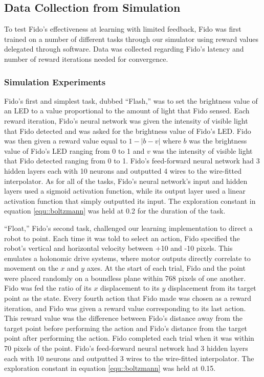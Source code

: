 \subsection{Data Collection from Simulation}

To test Fido's effectiveness at learning with limited feedback, Fido was first trained on a number of different tasks through our simulator using reward values delegated through software.
Data was collected regarding Fido's latency and number of reward iterations needed for convergence.

\subsubsection{Simulation Experiments}

Fido's first and simplest task, dubbed ``Flash,'' was to set the brightness value of an LED to a value proportional to the amount of light that Fido sensed.
Each reward iteration, Fido's neural network was given the intensity of visible light that Fido detected and was asked for the brightness value of Fido's LED.
Fido was then given a reward value equal to $1 - |b - v|$ where $b$ was the brightness value of Fido's LED ranging from 0 to 1 and $v$ was the intensity of visible light that Fido detected ranging from 0 to 1.
Fido's feed-forward neural network had 3 hidden layers each with 10 neurons and outputted 4 wires to the wire-fitted interpolator.
As for all of the tasks, Fido's neural network's input and hidden layers used a sigmoid activation function, while  its output layer used a linear activation function that simply outputted its input.
The exploration constant in equation \ref{equ::boltzmann} was held at 0.2 for the duration of the task.

``Float,'' Fido's second task, challenged our learning implementation to direct a robot to point.
Each time it was told to select an action, Fido specified the robot's vertical and horizontal velocity between +10 and -10 pixels.
This emulates a holonomic drive systems, where motor outputs directly correlate to movement on the $x$ and $y$ axes.
At the start of each trial, Fido and the point were placed randomly on a boundless plane within 768 pixels of one another.
Fido was fed the ratio of its $x$ displacement to its $y$ displacement from its target point as the state.
Every fourth action that Fido made was chosen as a reward iteration, and Fido was given a reward value corresponding to its last action.
This reward value was the difference between Fido's distance away from the target point before performing the action and Fido's distance from the target point after performing the action.
Fido completed each trial when it was within 70 pixels of the point.
Fido's feed-forward neural network had 3 hidden layers each with 10 neurons and outputted 3 wires to the wire-fitted interpolator.
The exploration constant in equation \ref{equ::boltzmann} was held at 0.15.

